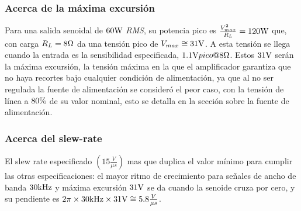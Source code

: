  
\subsubsection{Acerca de la máxima excursión}
 
 \begin{sloppypar}
 
Para una salida senoidal de $60\si[per-mode=symbol]{\watt}$ \textit{RMS}, su potencia pico es ${\frac{V_{max}^2}{R_L}=120\si[per-mode=symbol]{\watt}}$ que, con carga ${R_L=8\si[per-mode=symbol]{\ohm}}$ da una tensión pico de ${V_{max} \cong 31\si[per-mode=symbol]{\volt}}$. A esta tensión se llega cuando la entrada es la sensibilidad especificada, ${1.1\si[per-mode=symbol]{\volt} pico @8\si[per-mode=symbol]{\ohm}}$. Estos ${31\si[per-mode=symbol]{\volt}}$ serán la máxima excursión, la tensión máxima en la que el amplificador garantiza que no haya recortes bajo cualquier condición de alimentación, ya que al no ser regulada la fuente de alimentación se consideró el peor caso, con la tensión de línea a ${80\si[per-mode=symbol]{\percent}}$ de su valor nominal, esto se detalla en la sección sobre la fuente de alimentación.

\end{sloppypar}


\subsubsection{Acerca del slew-rate}

\begin{sloppypar}

El slew rate especificado ${\left(15\frac{V}{\mu s}\right)}$ mas que duplica el valor mínimo para cumplir las otras especificaciones: el mayor ritmo de crecimiento para señales de ancho de banda $30\si[per-mode=symbol]{\kilo\hertz}$ y máxima excursión $31\si[per-mode=symbol]{\volt}$ se da cuando la senoide cruza por cero, y su pendiente es ${2 \pi \times 30\si[per-mode=symbol]{\kilo\hertz}\times 31\si[per-mode=symbol]{\volt} \cong 5.8\frac{V}{\mu s}}$. 

\end{sloppypar}